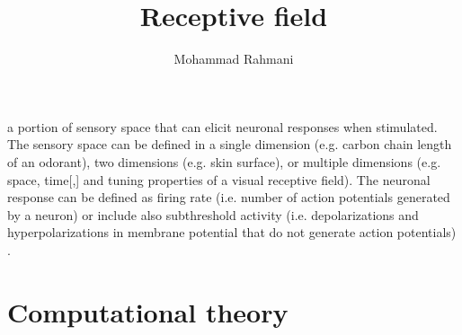 \documentclass[a4paper]{article}
\title{Receptive field}
\date{}
\author{Mohammad Rahmani}
\begin{document}
    \maketitle
    a portion of sensory space that can elicit neuronal responses when stimulated. The sensory space can be defined in a single dimension (e.g. carbon chain length of an odorant), two dimensions (e.g. skin surface), or multiple dimensions (e.g. space, time[,] and tuning properties of a visual receptive field). The neuronal response can be defined as firing rate (i.e. number of action potentials generated by a neuron) or include also subthreshold activity (i.e. depolarizations and hyperpolarizations in membrane potential that do not generate action potentials) .
    
    
    \section{Computational theory}
        
        \seeherefooter{}
        
        
\end{document}

